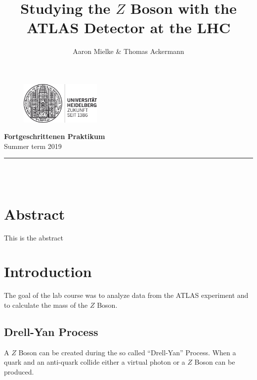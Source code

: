 \documentclass[12pt, a4paper, bibliography=totoc]{scrreprt}
\title{Studying the $Z$ Boson with the ATLAS Detector at the LHC}
\author{Aaron Mielke & Thomas Ackermann}
\begin{document}
\begin{center}
	\makeatletter
	\thispagestyle{empty}
	
	\begin{figure}[H]
	\flushright
	\includegraphics[width=0.35\textwidth]{fig/logo}
	\end{figure}
	
	\vspace{-30mm}
	
	\begin{flushleft}
	\large{\textbf{Fortgeschrittenen Praktikum} \\
		Summer term 2019} \\
	\end{flushleft}
	
	\vspace{5mm}
	
	\rule{\textwidth}{0.2pt}

	\vspace{50mm}
	\Huge\textbf{\@title} \\
	\vspace{10mm}
	\large{\@author} \\
	\normalfont
	
	\vspace{2mm}
	
	\makeatother
\end{center}

\normalsize
\newpage

\tableofcontents


\chapter*{Abstract}
This is the abstract





\chapter{Introduction}

The goal of the lab course was to analyze data from the ATLAS experiment and 
to calculate the mass of the $Z$ Boson.

\section{Drell-Yan Process}
A $Z$ Boson can be created during the so called ``Drell-Yan'' Process.
When a quark and an anti-quark collide either a virtual photon or a $Z$ Boson can be produced.
\end{document}
